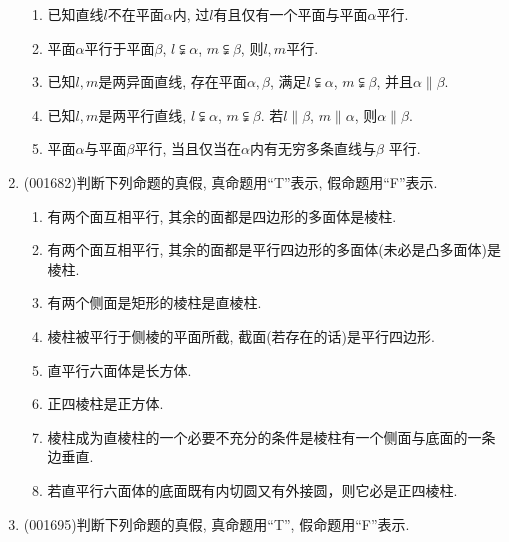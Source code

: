 \documentclass[10pt,a4paper]{article}
\newcommand{\blank}[1]{\underline{\hbox to #1pt{}}}
\begin{document}
\begin{enumerate}[1.]
\begin{enumerate}[\blank{30}(1)]
\item 已知直线$l$不在平面$\alpha$内, 过$l$有且仅有一个平面与平面$\alpha$平行.\\ 
\item 平面$\alpha$平行于平面$\beta$, $l\subsetneqq \alpha$, $m\subsetneqq \beta$, 则$l,m$平行.\\ 
\item 已知$l,m$是两异面直线, 存在平面$\alpha,\beta$, 满足$l\subsetneqq \alpha$, $m\subsetneqq\beta$, 并且$\alpha\parallel \beta$.\\ 
\item 已知$l,m$是两平行直线, $l\subsetneqq \alpha$, $m\subsetneqq \beta$. 若$l\parallel \beta$, $m\parallel \alpha$, 则$\alpha\parallel \beta$.\\ 
\item 平面$\alpha$与平面$\beta$平行, 当且仅当在$\alpha$内有无穷多条直线与$\beta$ 平行.\\ 
\end{enumerate}
\item {\tiny (001682)}判断下列命题的真假, 真命题用``{\textrm T}''表示, 假命题用``{\textrm F}''表示.\\ 
\begin{enumerate}[\blank{30}(1)]
\item 有两个面互相平行, 其余的面都是四边形的多面体是棱柱.\\ 
\item 有两个面互相平行, 其余的面都是平行四边形的多面体(未必是凸多面体)是棱柱.\\ 
\item 有两个侧面是矩形的棱柱是直棱柱.\\ 
\item 棱柱被平行于侧棱的平面所截, 截面(若存在的话)是平行四边形.\\ 
\item 直平行六面体是长方体.\\ 
\item 正四棱柱是正方体.\\ 
\item 棱柱成为直棱柱的一个必要不充分的条件是棱柱有一个侧面与底面的一条边垂直.\\ 
\item 若直平行六面体的底面既有内切圆又有外接圆，则它必是正四棱柱.\\ 
\end{enumerate}
\item {\tiny (001695)}判断下列命题的真假, 真命题用``{\textrm T}'', 假命题用``{\textrm F}''表示.\\ 
\begin{enumerate}[\blank{30}(1)]

\end{enumerate}
\end{enumerate}
\end{document}
